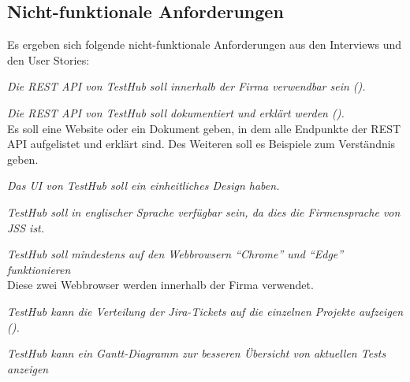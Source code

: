 \subsection{Nicht-funktionale Anforderungen}\label{sec:nfas}
Es ergeben sich folgende nicht-funktionale Anforderungen aus den Interviews und 
den User Stories:

\begin{description}

    \textit{Die REST API von TestHub soll innerhalb der Firma verwendbar sein ().}

    \textit{Die REST API von TestHub soll dokumentiert und erklärt werden ().}\\
    Es soll eine Website oder ein Dokument geben, in dem alle Endpunkte der REST API
    aufgelistet und erklärt sind. Des Weiteren soll es Beispiele zum 
    Verständnis geben.

    \textit{Das \gls{UI} von TestHub soll ein einheitliches Design haben.}

    \textit{TestHub soll in englischer Sprache verfügbar sein, da dies die 
    Firmensprache von JSS ist.}

    \textit{TestHub soll mindestens auf den Webbrowsern ``Chrome'' und ``Edge'' funktionieren}\\
    Diese zwei Webbrowser werden innerhalb der Firma verwendet.


    \textit{TestHub kann die Verteilung der Jira-Tickets auf die einzelnen Projekte 
    aufzeigen ().}

    \textit{TestHub kann ein Gantt-Diagramm zur besseren Übersicht von aktuellen Tests anzeigen}


    
\end{description}

\newpage